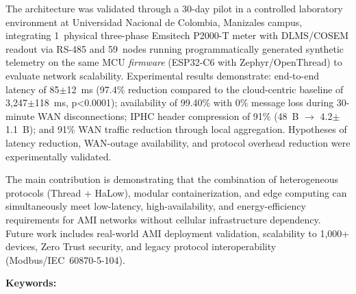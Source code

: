 \par The architecture was validated through a 30-day pilot in a controlled laboratory environment at Universidad Nacional de Colombia, Manizales campus, integrating 1~physical three-phase Emsitech P2000-T meter with DLMS/COSEM readout via RS-485 and 59~nodes running programmatically generated synthetic telemetry on the same MCU \textit{firmware} (ESP32-C6 with Zephyr/OpenThread) to evaluate network scalability. Experimental results demonstrate: end-to-end latency of 85$\pm$12~ms (97.4\% reduction compared to the cloud-centric baseline of 3,247$\pm$118~ms, p<0.0001); availability of 99.40\% with 0\% message loss during 30-minute WAN disconnections; IPHC header compression of 91\% (48~B $\rightarrow$ 4.2$\pm$1.1~B); and 91\% WAN traffic reduction through local aggregation. Hypotheses of latency reduction, WAN-outage availability, and protocol overhead reduction were experimentally validated.

\par The main contribution is demonstrating that the combination of heterogeneous protocols (Thread + HaLow), modular containerization, and edge computing can simultaneously meet low-latency, high-availability, and energy-efficiency requirements for AMI networks without cellular infrastructure dependency. Future work includes real-world AMI deployment validation, scalability to 1,000+ devices, Zero Trust security, and legacy protocol interoperability (Modbus/IEC~60870-5-104).

\vfill
\noindent\textbf{Keywords:} \keywords
